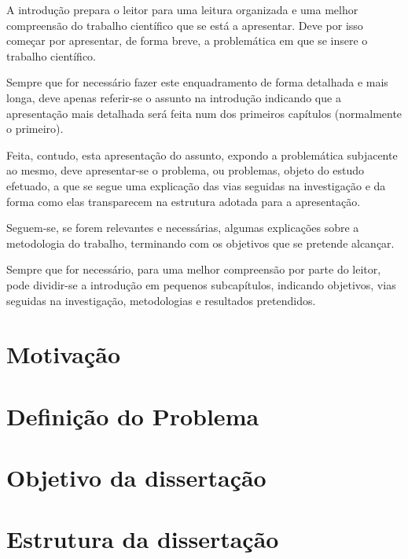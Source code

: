 \begin{introduction}

A introdução prepara o leitor para uma leitura organizada e uma melhor compreensão do trabalho científico que se está a apresentar. Deve por isso começar por apresentar, de forma breve, a problemática em que se insere o trabalho científico.

Sempre que for necessário fazer este enquadramento de forma detalhada e mais longa, deve apenas referir-se o assunto na introdução indicando que a apresentação mais detalhada será feita num dos primeiros capítulos (normalmente o primeiro).

Feita, contudo, esta apresentação do assunto, expondo a problemática subjacente ao mesmo, deve apresentar-se o problema, ou problemas, objeto do estudo efetuado, a que se segue uma explicação das vias seguidas na investigação e da forma como elas transparecem na estrutura adotada para a apresentação. 

Seguem-se, se forem relevantes e necessárias, algumas explicações sobre a metodologia do trabalho, terminando com os objetivos que se pretende alcançar. 

Sempre que for necessário, para uma melhor compreensão por parte do leitor, pode dividir-se a introdução em pequenos subcapítulos, indicando objetivos, vias seguidas na investigação, metodologias e resultados pretendidos.


\section{Motivação}

\section{Definição do Problema}

\section{Objetivo da dissertação}

\section{Estrutura da dissertação}



\end{introduction}